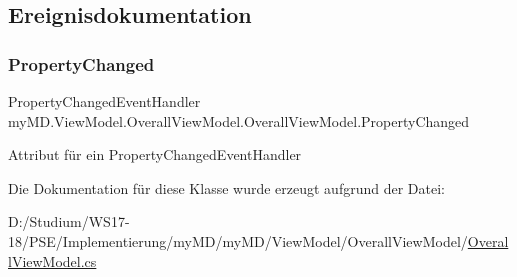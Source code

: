 \subsection{Ereignisdokumentation}
\mbox{\label{classmy_m_d_1_1_view_model_1_1_overall_view_model_1_1_overall_view_model_a1918d3d8d384486e278426327b16256f}} 
\subsubsection{\texorpdfstring{Property\+Changed}{PropertyChanged}}
{\footnotesize\ttfamily Property\+Changed\+Event\+Handler my\+M\+D.\+View\+Model.\+Overall\+View\+Model.\+Overall\+View\+Model.\+Property\+Changed}



Attribut für ein Property\+Changed\+Event\+Handler 



Die Dokumentation für diese Klasse wurde erzeugt aufgrund der Datei\+:\begin{DoxyCompactItemize}
\item 
D\+:/\+Studium/\+W\+S17-\/18/\+P\+S\+E/\+Implementierung/my\+M\+D/my\+M\+D/\+View\+Model/\+Overall\+View\+Model/\mbox{\hyperlink{_overall_view_model_8cs}{Overall\+View\+Model.\+cs}}\end{DoxyCompactItemize}
